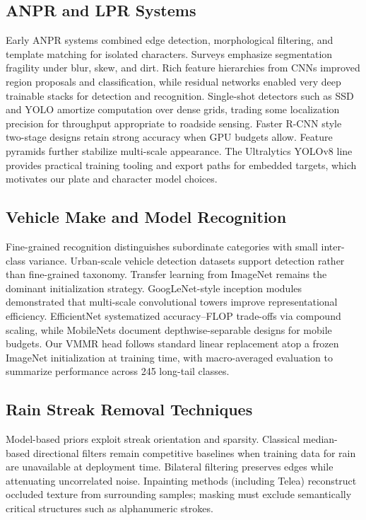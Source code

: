 \subsection{ANPR and LPR Systems}
Early ANPR systems combined edge detection, morphological filtering, and template matching for isolated characters. Surveys emphasize segmentation fragility under blur, skew, and dirt. Rich feature hierarchies from CNNs improved region proposals and classification, while residual networks enabled very deep trainable stacks for detection and recognition. Single-shot detectors such as SSD and YOLO amortize computation over dense grids, trading some localization precision for throughput appropriate to roadside sensing. Faster R-CNN style two-stage designs retain strong accuracy when GPU budgets allow. Feature pyramids further stabilize multi-scale appearance. The Ultralytics YOLOv8 line provides practical training tooling and export paths for embedded targets, which motivates our plate and character model choices.

\subsection{Vehicle Make and Model Recognition}
Fine-grained recognition distinguishes subordinate categories with small inter-class variance. Urban-scale vehicle detection datasets support detection rather than fine-grained taxonomy. Transfer learning from ImageNet remains the dominant initialization strategy. GoogLeNet-style inception modules demonstrated that multi-scale convolutional towers improve representational efficiency. EfficientNet systematized accuracy--FLOP trade-offs via compound scaling, while MobileNets document depthwise-separable designs for mobile budgets. Our VMMR head follows standard linear replacement atop a frozen ImageNet initialization at training time, with macro-averaged evaluation to summarize performance across 245 long-tail classes.

\subsection{Rain Streak Removal Techniques}
Model-based priors exploit streak orientation and sparsity. Classical median-based directional filters remain competitive baselines when training data for rain are unavailable at deployment time. Bilateral filtering preserves edges while attenuating uncorrelated noise. Inpainting methods (including Telea) reconstruct occluded texture from surrounding samples; masking must exclude semantically critical structures such as alphanumeric strokes.

